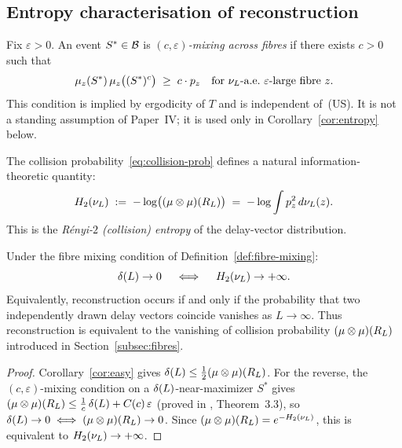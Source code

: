 \subsection{Entropy characterisation of reconstruction}
\label{subsec:entropy}

\begin{definition}
\label{def:fibre-mixing}
Fix $\varepsilon > 0$.
An event $S^* \in \mathcal{B}$ is \emph{$(c,\varepsilon)$-mixing across fibres} if
there exists $c > 0$ such that
\[
  \mu_z(S^*)\,\mu_z\bigl((S^*)^c\bigr) \;\geq\; c\cdot p_z
  \quad\text{for $\nu_L$-a.e.\ $\varepsilon$-large fibre } z.
\]
This condition is implied by ergodicity of $T$ and is independent of~(US).
It is not a standing assumption of Paper~IV; it is used only in
Corollary~\ref{cor:entropy} below.
\end{definition}

The collision probability~\eqref{eq:collision-prob} defines a natural
information-theoretic quantity:
\begin{equation}
  H_2(\nu_L) \;:=\; -\log\bigl((\mu \otimes \mu)(R_L)\bigr)
  \;=\; -\log \int p_z^2\,d\nu_L(z).
  \label{eq:entropy}
\end{equation}
This is the \emph{Rényi-$2$ (collision) entropy} of the delay-vector distribution.

\begin{corollary}
\label{cor:entropy}
Under the fibre mixing condition of Definition~\ref{def:fibre-mixing}:
\[
  \delta(L) \to 0
  \quad\iff\quad
  H_2(\nu_L) \to +\infty.
\]
Equivalently, reconstruction occurs if and only if the probability that two
independently drawn delay vectors coincide vanishes as $L \to \infty$.
Thus reconstruction is equivalent to the vanishing of collision probability
$(\mu \otimes \mu)(R_L)$ introduced in Section~\ref{subsec:fibres}.
\end{corollary}

\begin{proof}
Corollary~\ref{cor:easy} gives $\delta(L) \leq \tfrac{1}{2}(\mu\otimes\mu)(R_L)$.
For the reverse, the $(c,\varepsilon)$-mixing condition on a $\delta(L)$-near-maximizer
$S^*$ gives $(\mu\otimes\mu)(R_L) \leq \frac{1}{c}\,\delta(L) + C(c)\,\varepsilon$
(proved in \cite{mahon_bridge}, Theorem~3.3), so $\delta(L) \to 0 \iff
(\mu\otimes\mu)(R_L) \to 0$.
Since $(\mu\otimes\mu)(R_L) = e^{-H_2(\nu_L)}$, this is equivalent to
$H_2(\nu_L) \to +\infty$.
\end{proof}

